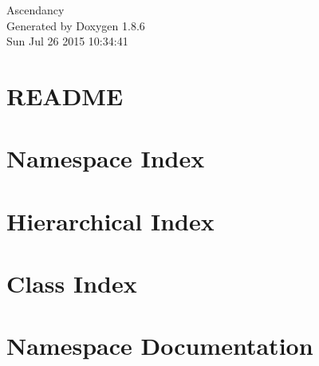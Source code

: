 \documentclass[twoside]{book}
\newcommand{\clearemptydoublepage}{%
  \newpage{\pagestyle{empty}\cleardoublepage}%
}
\begin{document}
\hypersetup{pageanchor=false}
\begin{titlepage}
\vspace*{7cm}
\begin{center}%
{\Large Ascendancy }\\
\vspace*{1cm}
{\large Generated by Doxygen 1.8.6}\\
\vspace*{0.5cm}
{\small Sun Jul 26 2015 10:34:41}\\
\end{center}
\end{titlepage}
\clearemptydoublepage
\tableofcontents
\clearemptydoublepage
{}
\hypersetup{pageanchor=true}

\chapter{R\-E\-A\-D\-M\-E}
\label{md_README}
\hypertarget{md_README}{}

\chapter{Namespace Index}

\chapter{Hierarchical Index}

\chapter{Class Index}

\chapter{Namespace Documentation}
































\end{document}
